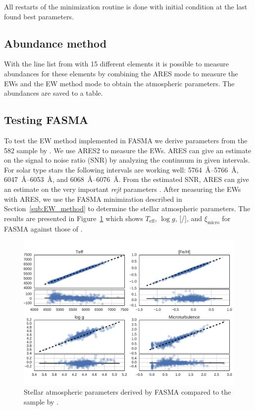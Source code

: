 \documentclass{aa}
\begin{document}
All restarts of the minimization routine is done with initial condition at the
last found best parameters.


\subsection{Abundance method}
\label{sub:Abundance_method}

With the line list from \citet{Neves2009} with 15 different elements it is
possible to measure abundances for these elements by combining the ARES mode to
measure the EWs and the EW method mode to obtain the atmospheric parameters. The
abundances are saved to a table.


\subsection{Testing FASMA}
\label{sub:Testing_FASMA}
To test the EW method implemented in FASMA we derive parameters from the 582
sample by \citet{Sousa2011}. We use ARES2 to measure the EWs. ARES can give an
estimate on the signal to noise ratio (SNR) by analyzing the continuum in given
intervals. For solar type stars the following intervals are working well:
\SIrange{5764}{5766}{\angstrom}, \SIrange{6047}{6053}{\angstrom}, and
\SIrange{6068}{6076}{\angstrom}. From the estimated SNR, ARES can give an
estimate on the very important \emph{rejt} parameters \citep[see][for more
information]{Sousa2015a}. After measuring the EWs with ARES, we use the FASMA
minimization described in Section~\ref{sub:EW_method} to determine the stellar
atmospheric parameters. The results are presented in Figure~\ref{fig:FASMATest}
which shows $T_\mathrm{eff}$, $\log g$, [/], and
$\xi_\mathrm{micro}$ for FASMA against those of \citet{Sousa2011}.

\begin{figure}[tpb]
    \centering
    \includegraphics[width=1.0\linewidth,natwidth=750,natheight=500]{figures/FASMATest.pdf}
    \caption{Stellar atmospheric parameters derived by FASMA compared
    to the sample by \citet{Sousa2011}.}
    \label{fig:FASMATest}
\end{figure}
\end{document}
